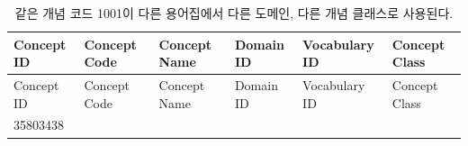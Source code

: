 \documentclass[10.5pt]{book}
\theoremstyle{definition}
\theoremstyle{definition}
\theoremstyle{definition}
\theoremstyle{remark}
\begin{document}
\begin{longtable}[]{@{}llllll@{}}
\caption{\label{tab:code1001} 같은 개념 코드 1001이 다른 용어집에서 다른
도메인, 다른 개념 클래스로 사용된다.}\tabularnewline
\toprule
\begin{minipage}[b]{0.13\columnwidth}\raggedright\strut
Concept ID\strut
\end{minipage} & \begin{minipage}[b]{0.07\columnwidth}\raggedright\strut
Concept Code\strut
\end{minipage} & \begin{minipage}[b]{0.16\columnwidth}\raggedright\strut
Concept Name\strut
\end{minipage} & \begin{minipage}[b]{0.14\columnwidth}\raggedright\strut
Domain ID\strut
\end{minipage} & \begin{minipage}[b]{0.14\columnwidth}\raggedright\strut
Vocabulary ID\strut
\end{minipage} & \begin{minipage}[b]{0.14\columnwidth}\raggedright\strut
Concept Class\strut
\end{minipage}\tabularnewline
\midrule
\endfirsthead
\toprule
\begin{minipage}[b]{0.13\columnwidth}\raggedright\strut
Concept ID\strut
\end{minipage} & \begin{minipage}[b]{0.07\columnwidth}\raggedright\strut
Concept Code\strut
\end{minipage} & \begin{minipage}[b]{0.16\columnwidth}\raggedright\strut
Concept Name\strut
\end{minipage} & \begin{minipage}[b]{0.14\columnwidth}\raggedright\strut
Domain ID\strut
\end{minipage} & \begin{minipage}[b]{0.14\columnwidth}\raggedright\strut
Vocabulary ID\strut
\end{minipage} & \begin{minipage}[b]{0.14\columnwidth}\raggedright\strut
Concept Class\strut
\end{minipage}\tabularnewline
\midrule
\endhead
\begin{minipage}[t]{0.13\columnwidth}\raggedright\strut
35803438\strut
\end{minipage} & \begin{minipage}[t]{0.07\columnwidth}\raggedright\strut

\end{minipage}
\end{longtable}
\end{document}
